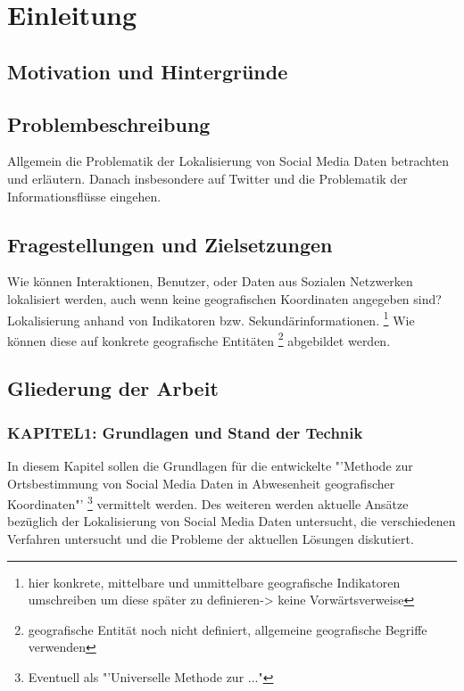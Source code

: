 \chapter{Einleitung}

	\section{Motivation und Hintergründe}

	\section{Problembeschreibung} 
	Allgemein die Problematik der Lokalisierung von Social Media Daten betrachten und erläutern.
	Danach insbesondere auf Twitter und die Problematik der Informationsflüsse eingehen.

	\section{Fragestellungen und Zielsetzungen}
	Wie können Interaktionen, Benutzer, oder Daten aus Sozialen Netzwerken lokalisiert werden, auch wenn keine geografischen Koordinaten angegeben sind? 
	Lokalisierung anhand von Indikatoren bzw. Sekundärinformationen.
	\footnote{hier konkrete, mittelbare und unmittelbare geografische Indikatoren umschreiben um diese später zu definieren-> keine Vorwärtsverweise} 
	Wie können diese auf konkrete geografische Entitäten \footnote{geografische Entität noch nicht definiert, allgemeine geografische Begriffe verwenden}  abgebildet werden. 

	\section{Gliederung der Arbeit}

		\subsection*{KAPITEL1: Grundlagen und Stand der Technik}
			In diesem Kapitel sollen die Grundlagen für die entwickelte "'Methode zur Ortsbestimmung von Social Media Daten in Abwesenheit geografischer Koordinaten"' \footnote{Eventuell als "'Universelle Methode zur ..."} vermittelt werden. 
			Des weiteren werden aktuelle Ansätze bezüglich der Lokalisierung von Social Media Daten untersucht, die verschiedenen Verfahren untersucht und die Probleme der aktuellen Lösungen diskutiert.

